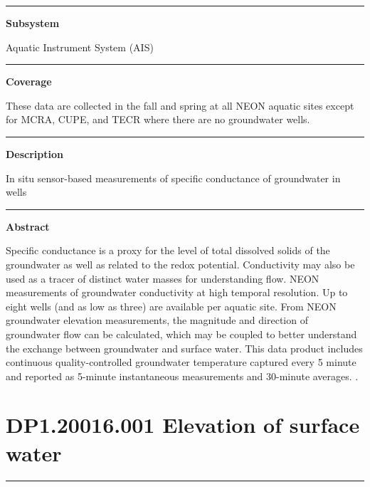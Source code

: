 \documentclass[]{article}
\begin{document}
\begin{center}\rule{0.5\linewidth}{\linethickness}\end{center}

\textbf{Subsystem}

Aquatic Instrument System (AIS)

\begin{center}\rule{0.5\linewidth}{\linethickness}\end{center}

\textbf{Coverage}

These data are collected in the fall and spring at all NEON aquatic
sites except for MCRA, CUPE, and TECR where there are no groundwater
wells.

\begin{center}\rule{0.5\linewidth}{\linethickness}\end{center}

\textbf{Description}

In situ sensor-based measurements of specific conductance of groundwater
in wells

\begin{center}\rule{0.5\linewidth}{\linethickness}\end{center}

\textbf{Abstract}

Specific conductance is a proxy for the level of total dissolved solids
of the groundwater as well as related to the redox potential.
Conductivity may also be used as a tracer of distinct water masses for
understanding flow. NEON measurements of groundwater conductivity at
high temporal resolution. Up to eight wells (and as low as three) are
available per aquatic site. From NEON groundwater elevation
measurements, the magnitude and direction of groundwater flow can be
calculated, which may be coupled to better understand the exchange
between groundwater and surface water. This data product includes
continuous quality-controlled groundwater temperature captured every 5
minute and reported as 5-minute instantaneous measurements and 30-minute
averages. \newpage
.

\section{DP1.20016.001 Elevation of surface
water}\label{dp1.20016.001-elevation-of-surface-water}

\begin{center}\rule{0.5\linewidth}{\linethickness}\end{center}
\end{document}
